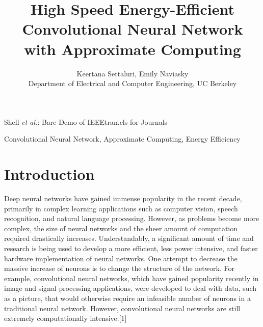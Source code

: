 \documentclass[journal]{IEEEtran}
\begin{document}
%
\title{High Speed Energy-Efficient Convolutional Neural Network with Approximate Computing}

\author{Keertana Settaluri,
        Emily Naviasky\\%
        Department of Electrical and Computer Engineering, UC Berkeley}

%
{Shell \MakeLowercase{\textit{et al.}}: Bare Demo of IEEEtran.cls for Journals}

\maketitle


\begin{abstract}
\blindtext[1]
\end{abstract}

\begin{IEEEkeywords}
Convolutional Neural Network, Approximate Computing, Energy Efficiency
\end{IEEEkeywords}

\IEEEpeerreviewmaketitle

\section{Introduction}
\indent Deep neural networks have gained immense popularity in the recent decade, primarily in complex learning applications such as computer vision, speech recognition, and natural language processing. However, as problems become more complex, the size of neural networks and the sheer amount of computation required drastically increases. Understandably, a significant amount of time and research is being used to develop a more efficient, less power intensive, and faster hardware implementation of neural networks. One attempt to decrease the massive increase of neurons is to change the structure of the network. For example, convolutional neural networks, which have gained popularity recently in image and signal processing applications, were developed to deal with data, such as a picture, that would otherwise require an infeasible number of neurons in a traditional neural network. However, convolutional neural networks are still extremely computationally intensive.[1] \\
	
\end{document}
